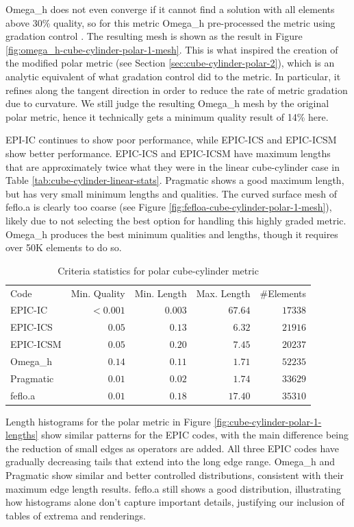 \documentclass[3p,times,procedia,number]{elsarticle}
\begin{document}
Omega\_h does not even converge if it cannot find a solution with
all elements above 30\% quality, so for this metric Omega\_h
pre-processed the metric using gradation control \cite{alauzet-fead-2010-size-gradation-aniso}.
The resulting mesh is shown as the result in Figure \ref{fig:omega_h-cube-cylinder-polar-1-mesh}.
This is what inspired the creation of the modified polar metric
(see Section \ref{sec:cube-cylinder-polar-2}),
which is an analytic equivalent of what gradation control did
to the metric.
In particular, it refines along the tangent direction
in order to reduce the rate of metric gradation due to curvature.
We still judge the resulting Omega\_h mesh by the original polar
metric, hence it technically gets a minimum quality result of 14\% here.

EPI-IC continues to show poor performance, while EPIC-ICS
and EPIC-ICSM show better performance.
EPIC-ICS and EPIC-ICSM have maximum lengths that are approximately
twice what they were in the linear cube-cylinder case in
Table \ref{tab:cube-cylinder-linear-stats}.
Pragmatic shows a good maximum length,
but has very small minimum lengths and qualities.
The curved surface mesh of feflo.a is clearly too coarse
(see Figure \ref{fig:fefloa-cube-cylinder-polar-1-mesh}),
likely due to not selecting the best option for handling
this highly graded metric.
Omega\_h produces the best minimum qualities and lengths,
though it requires over 50K elements to do so.

\begin{table}
\caption{Criteria statistics for polar cube-cylinder metric}
\label{tab:polar-1-stats}
\begin{tabular}{lrrrr}
Code & Min. Quality & Min. Length & Max. Length & \#Elements\\
EPIC-IC    &$<0.001$&      $0.003$&      $67.64$&    $17338$\\
EPIC-ICS   &$  0.05$&      $ 0.13$&      $ 6.32$&    $21916$\\
EPIC-ICSM  &$  0.05$&      $ 0.20$&      $ 7.45$&    $20237$\\
Omega\_h   &$  0.14$&      $ 0.11$&      $ 1.71$&    $52235$\\
Pragmatic  &$  0.01$&      $ 0.02$&      $ 1.74$&    $33629$\\
feflo.a    &$  0.01$&      $ 0.18$&      $17.40$&    $35310$\\
\end{tabular}
\end{table}

Length histograms for the polar metric in Figure \ref{fig:cube-cylinder-polar-1-lengths}
show similar patterns for the EPIC codes, with the main difference being the
reduction of small edges as operators are added.
All three EPIC codes have gradually decreasing tails that extend into the long edge range.
Omega\_h and Pragmatic show similar and better controlled distributions, consistent
with their maximum edge length results.
feflo.a still shows a good distribution, illustrating how histograms alone
don't capture important details, justifying our inclusion of tables of extrema
and renderings.
\end{document}
